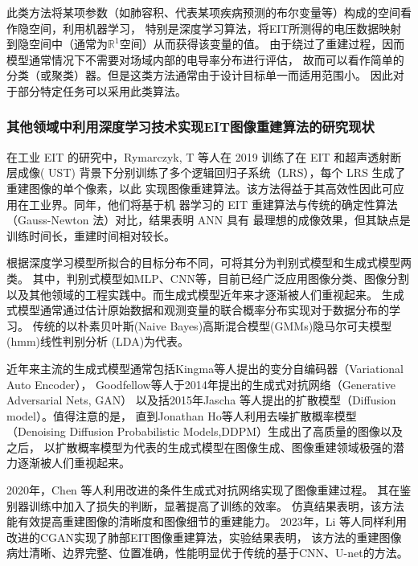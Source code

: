 此类方法将某项参数（如肺容积、代表某项疾病预测的布尔变量等）构成的空间看作隐空间，利用机器学习，
特别是深度学习算法，将EIT所测得的电压数据映射到隐空间中（通常为$\mathbb{R}^1$空间）从而获得该变量的值。
由于绕过了重建过程，因而模型通常情况下不需要对场域内部的电导率分布进行评估，
故而可以看作简单的分类（或聚类）器。但是这类方法通常由于设计目标单一而适用范围小。
因此对于部分特定任务可以采用此类算法。 

\subsubsection{其他领域中利用深度学习技术实现EIT图像重建算法的研究现状}

在工业 EIT 的研究中，Rymarczyk, T 等人在 2019 训练了在 EIT 和超声透射断层成像( UST)
背景下分别训练了多个逻辑回归子系统（LRS），每个 LRS 生成了重建图像的单个像素，以此
实现图像重建算法。该方法得益于其高效性因此可应用在工业界\cite{s19153400}。同年，他们将基于机
器学习的 EIT 重建算法与传统的确定性算法（Gauss-Newton 法）对比，结果表明 ANN 具有
最理想的成像效果，但其缺点是训练时间长，重建时间相对较长\cite{article123456}。


根据深度学习模型所拟合的目标分布不同，可将其分为判别式模型和生成式模型两类。
其中，判别式模型如MLP、CNN等，目前已经广泛应用图像分类、图像分割以及其他领域的工程实践中。而生成式模型近年来才逐渐被人们重视起来。
生成式模型通常通过估计原始数据和观测变量的联合概率分布实现对于数据分布的学习。
传统的以朴素贝叶斯(Naive Bayes)高斯混合模型(GMMs)隐马尔可夫模型(hmm)线性判别分析 (LDA)为代表。

近年来主流的生成式模型通常包括Kingma等人提出的变分自编码器（Variational Auto Encoder）\cite{2013Auto}，
Goodfellow等人于2014年提出的生成式对抗网络\cite{2014Generative}（Generative Adversarial Nets, GAN）
以及括2015年Jascha 等人提出的扩散模型\cite{DiffusionModel}（Diffusion model）。值得注意的是，
直到Jonathan Ho等人利用去噪扩散概率模型\cite{DDPM}（Denoising Diffusion Probabilistic Models,DDPM）生成出了高质量的图像以及之后，
以扩散概率模型为代表的生成式模型在图像生成、图像重建领域极强的潜力逐渐被人们重视起来。

2020年，Chen 等人利用改进的条件生成式对抗网络实现了图像重建过程。
其在鉴别器训练中加入了损失的判断，显著提高了训练的效率\cite{Chen2020}。
仿真结果表明，该方法能有效提高重建图像的清晰度和图像细节的重建能力。
2023年，Li 等人同样利用改进的CGAN实现了肺部EIT图像重建算法，实验结果表明，
该方法的重建图像病灶清晰、边界完整、位置准确，性能明显优于传统的基于CNN、U-net的方法\cite{2023SAR}。 


